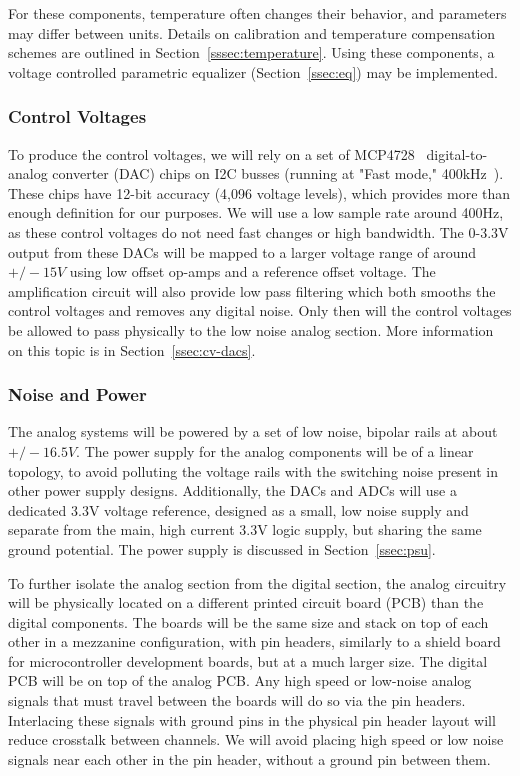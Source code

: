 \documentclass[11pt, letterpaper,titlepage]{article}
\begin{document}
For these components, temperature often changes their behavior, and parameters may differ between units. Details on calibration and temperature compensation schemes are outlined in Section~\ref{sssec:temperature}. Using these components, a voltage controlled parametric equalizer (Section~\ref{ssec:eq}) may be implemented.


\subsubsection*{Control Voltages}
To produce the control voltages, we will rely on a set of MCP4728~\cite{mcp4728} digital-to-analog converter (DAC) chips on I2C busses (running at "Fast mode," 400kHz~\cite{i2cspec}). These chips have 12-bit accuracy (4,096 voltage levels), which provides more than enough definition for our purposes. We will use a low sample rate around 400Hz, as these control voltages do not need fast changes or high bandwidth. The 0-3.3V output from these DACs will be mapped to a larger voltage range of around $+/- 15V$ using low offset op-amps and a reference offset voltage. The amplification circuit will also provide low pass filtering which both smooths the control voltages and removes any digital noise. Only then will the control voltages be allowed to pass physically to the low noise analog section. More information on this topic is in Section~\ref{ssec:cv-dacs}.

\subsubsection*{Noise and Power}
The analog systems will be powered by a set of low noise, bipolar rails at about $+/- 16.5V$. The power supply for the analog components will be of a linear topology, to avoid polluting the voltage rails with the switching noise present in other power supply designs. Additionally, the DACs and ADCs will use a dedicated 3.3V voltage reference, designed as a small, low noise supply and separate from the main, high current 3.3V logic supply, but sharing the same ground potential. The power supply is discussed in Section~\ref{ssec:psu}.

To further isolate the analog section from the digital section, the analog circuitry will be physically located on a different printed circuit board (PCB) than the digital components. The boards will be the same size and stack on top of each other in a mezzanine configuration, with pin headers, similarly to a shield board for microcontroller development boards, but at a much larger size. The digital PCB will be on top of the analog PCB. Any high speed or low-noise analog signals that must travel between the boards will do so via the pin headers. Interlacing these signals with ground pins in the physical pin header layout will reduce crosstalk between channels. We will avoid placing high speed or low noise signals near each other in the pin header, without a ground pin between them.
\end{document}
